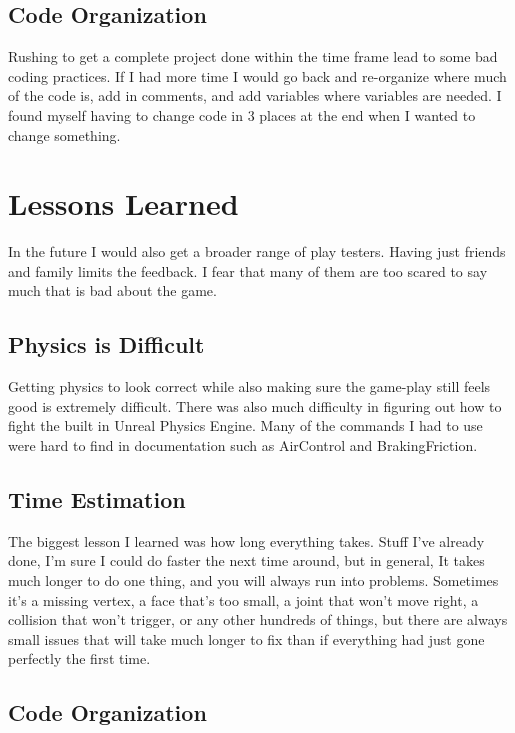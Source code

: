 \documentclass[conference,compsoc]{IEEEtran}
\begin{document}
\subsection{Code Organization}

Rushing to get a complete project done within the time frame lead to some bad coding practices. If I had more time I would go back and re-organize where much of the code is, add in comments, and add variables where variables are needed. I found myself having to change code in 3 places at the end when I wanted to change something.

\section{Lessons Learned}

In the future I would also get a broader range of play testers. Having just friends and family limits the feedback. I fear that many of them are too scared to say much that is bad about the game.

\subsection{Physics is Difficult}

Getting physics to look correct while also making sure the game-play still feels good is  extremely difficult. There was also much difficulty in figuring out how to fight the built in Unreal Physics Engine. Many of the commands I had to use were hard to find in documentation such as AirControl and BrakingFriction.

\subsection{Time Estimation}

The biggest lesson I learned was how long everything takes. Stuff I've already done, I'm sure I could do faster the next time around, but in general, It takes much longer to do one thing, and you will always run into problems. Sometimes it's a missing vertex, a face that's too small, a joint that won't move right, a collision that won't trigger, or any other hundreds of things, but there are always small issues that will take much longer to fix than if everything had just gone perfectly the first time.

\subsection{Code Organization}
\end{document}
